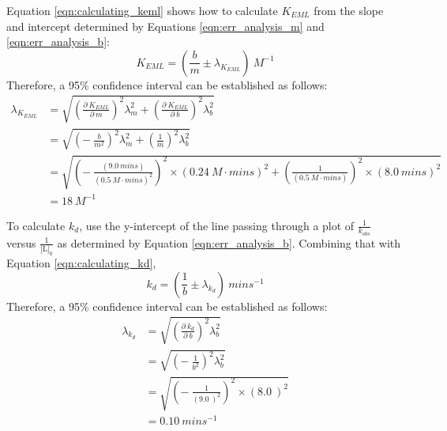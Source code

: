 Equation \eqref{eqn:calculating_keml} shows how to calculate $K_{EML}$ from the slope and intercept determined by Equations \eqref{eqn:err_analysis_m} and \eqref{eqn:err_analysis_b}:
\begin{equation*}
K_{EML}=\left (\frac{b}{m}\pm\lambda_{K_{EML}}\right ){\ }M^{-1}
\end{equation*}
Therefore, a 95\% confidence interval can be established as follows:
\begin{equation}\label{eqn:err_anal_keml}
\begin{split}
\lambda_{K_{EML}}&=\sqrt{\left (\frac{\partial{\ }K_{EML}}{\partial{\ }m}\right )^{2}\lambda_{m}^{2}+\left (\frac{\partial{\ }K_{EML}}{\partial{\ }b}\right )^{2}\lambda_{b}^{2}} \\
&=\sqrt{\left (-{\ }\frac{b}{m^{2}}\right )^{2}\lambda_{m}^{2}+\left (\frac{1}{m}\right )^{2}\lambda_{b}^{2}} \\
&=\sqrt{\left (-{\ }\frac{\left (9.0{\ }mins\right )}{\left (0.5{\ }M\cdot{mins}\right )^{2}}\right )^2\times\left (0.24{\ }M\cdot{mins}\right )^2+\left (\frac{1}{\left (0.5{\ }M\cdot{mins}\right )}\right )^2\times\left (8.0{\ }mins\right )^2} \\
&=18\ M^{-1}
\end{split}
\end{equation}

To calculate $k_d$, use the y-intercept of the line passing through a plot of $\frac{1}{k_{obs}}$ versus $\frac{1}{\text{[L]}_0}$ as determined by Equation \eqref{eqn:err_analysis_b}. Combining that with Equation \eqref{eqn:calculating_kd},
\begin{equation*}
k_{d}=\left (\frac{1}{b}\pm\lambda_{k_{d}}\right ){\ }mins^{-1}
\end{equation*}
Therefore, a 95\% confidence interval can be established as follows:
\begin{equation}\label{eqn:err_anal_kd}
\begin{split}
\lambda_{k_{d}}&=\sqrt{\left (\frac{\partial{\ }k_{d}}{\partial{\ }b}\right )^{2}\lambda_{b}^{2}}\\
&=\sqrt{\left (-{\ }\frac{1}{b^{2}}\right )^{2}\lambda_{b}^{2}}\\
&=\sqrt{\left (-{\ }\frac{1}{\left (9.0{\ }\right )^{2}}\right )^2\times\left (8.0{\ }\right )^2}\\
&=0.10\ mins^{-1}
\end{split}
\end{equation}
